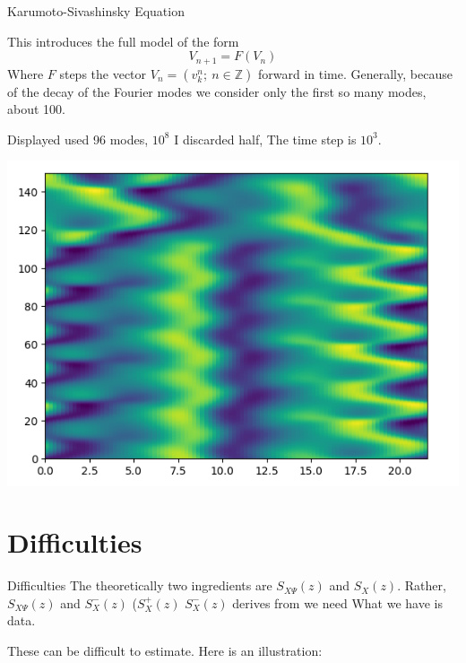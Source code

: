\documentclass{beamer}  %
\begin{document}
\begin{frame}{Karumoto-Sivashinsky Equation}
\begin{minipage}{.5\textwidth}
	This introduces the full model of the form
$$V_{n+1} = F(V_n)$$
Where $F$ steps the vector $V_n = (v_k^n;\: n\in \mathbb{Z})$ forward in time. Generally, because of the decay of the Fourier modes we consider only the first so many modes, about 100.

Displayed used 96 modes, $10^8$ I discarded half, The time step is $10^3.$ 
	\end{minipage}\begin{minipage}{.5\textwidth}
	\includegraphics[scale=.45]{fig/KSE_mine.png}
\end{minipage}
\end{frame}

\section{Difficulties}
\begin{frame}{Difficulties}
	The theoretically two ingredients are $S_{X\Psi}(z)$ and $S_{X}(z)$. Rather, $S_{X\Psi}(z)$ and $S^-_{X}(z)$ ($S^+_{X}(z)$ $S^-_{X}(z)$ derives from we need What we have is data. 
	
	These can be difficult to estimate. Here is an illustration: 
	
\end{frame}		
\end{document}
